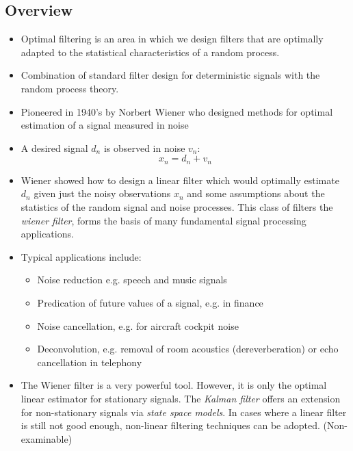 \documentclass[12pt]{article}
\newcommand{\titc}[1]{\textit{\textcolor{blue1}{#1}}}
\begin{document}
\subsection{Overview}
\begin{itemize}
    \item Optimal filtering is an area in which we design filters that are optimally adapted to the statistical characteristics of a random process. 
    \item Combination of standard filter design for deterministic signals with the random process theory.
    \item Pioneered in 1940's by Norbert Wiener who designed methods for optimal estimation of a signal measured in noise
    \item A desired signal $d_n$ is observed in noise $v_n$:
    \[
    x_n = d_n + v_n
    \]
    \item Wiener showed how to design a linear filter which would optimally estimate $d_n$ given just the noisy observations $x_n$ and some assumptions about the statistics of the random signal and noise processes. This class of filters the \titc{wiener filter}, forms the basis of many fundamental signal processing applications.
    \item Typical applications include:
    \begin{itemize}
        \item Noise reduction e.g. speech and music signals 
        \item Predication of future values of a signal, e.g. in finance 
        \item Noise cancellation, e.g. for aircraft cockpit noise
        \item Deconvolution, e.g. removal of room acoustics (dereverberation) or echo cancellation in telephony
    \end{itemize}
    \item The Wiener filter is a very powerful tool. However, it is only the optimal linear estimator for stationary signals. The \titc{Kalman filter} offers an extension for non-stationary signals via \titc{state space models}. In cases where a linear filter is still not good enough, non-linear filtering techniques can be adopted. (Non-examinable)
\end{itemize}
\end{document}
